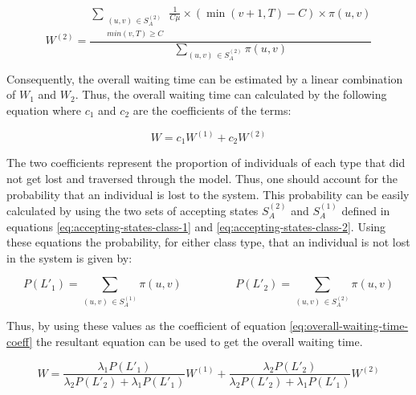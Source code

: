 \begin{equation}\label{eq:closed-form-waiting-class-2}
    W^{(2)} = \frac{\sum_{\substack{(u,v) \, \in S_A^{(2)} \\ min(v,T) \geq C}} 
    \frac{1}{C \mu} \times (\min(v+1,T)-C) \times \pi(u,v)}{\sum_{(u,v) \, 
    \in S_A^{(2)}} \pi(u,v)}
\end{equation}

Consequently, the overall waiting time can be estimated by a linear combination 
of \(W_1\) and \(W_2\). 
Thus, the overall waiting time can calculated by the following equation where 
\(c_1\) and \(c_2\) are the coefficients of the terms:

\begin{equation}\label{eq:overall-waiting-time-coeff}
    W = c_1 W^{(1)} + c_2 W^{(2)}
\end{equation}

The two coefficients represent the proportion of individuals of each type that 
did not get lost and traversed through the model.
Thus, one should account for the probability that an individual is lost to the 
system. 
This probability can be easily calculated by using the two sets of accepting 
states \(S_A^{(2)}\) and \(S_A^{(1)}\) defined in equations 
\ref{eq:accepting-states-class-1} and \ref{eq:accepting-states-class-2}. 
Using these equations the probability, for either class type, that an individual 
is not lost in the system is given by:

\begin{equation*}
    P(L'_1) = \sum_{(u,v) \, \in S_A^{(1)}} \pi(u,v) \hspace{2cm}
    P(L'_2) = \sum_{(u,v) \, \in S_A^{(2)}} \pi(u,v)
\end{equation*}
 
Thus, by using these values as the coefficient of equation 
\ref{eq:overall-waiting-time-coeff} the resultant equation can be used to get 
the overall waiting time. 

\begin{equation}\label{overall-waiting-time}
    W = \frac{\lambda_1 P(L'_1)}{\lambda_2 P(L'_2) + \lambda_1 P(L'_1)} W^{(1)} + 
    \frac{\lambda_2 P(L'_2)}{\lambda_2 P(L'_2) + \lambda_1 P(L'_1)} W^{(2)}
\end{equation}
